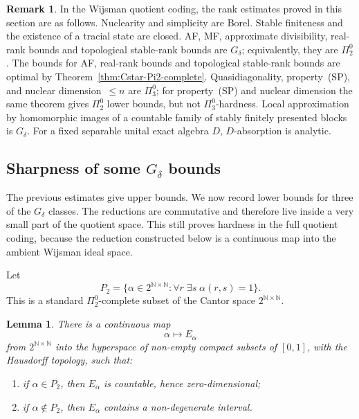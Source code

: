 \documentclass[12pt,fleqn,a4paper]{amsart}
\renewcommand{\le}{\leqslant}
\numberwithin{equation}{section}
\newtheorem{lemma}[theorem]{Lemma}
\theoremstyle{definition}
\newtheorem{remark}[theorem]{Remark}
\newcommand{\N}{\mathbb{N}}
\begin{document}
\begin{remark}\label{rem:summary}
In the Wijsman quotient coding, the rank estimates proved in this section are as
follows.  Nuclearity and simplicity are Borel.  Stable finiteness and the existence of a
tracial state are closed.  AF, MF, approximate divisibility, real-rank bounds and
topological stable-rank bounds are $G_\delta$; equivalently, they are $\Pi^0_2$.
The bounds for AF, real-rank bounds and topological stable-rank bounds are optimal by
Theorem~\ref{thm:Cstar-Pi2-complete}.  Quasidiagonality, property~(SP), and nuclear
dimension~$\le n$ are $\Pi^0_3$; for property~(SP) and nuclear dimension the same
theorem gives $\Pi^0_2$ lower bounds, but not $\Pi^0_3$-hardness.
Local approximation by homomorphic images of a countable family of stably finitely
presented blocks is $G_\delta$.  For a fixed separable unital exact algebra $D$,
$D$-absorption is analytic.
\end{remark}

\subsection{Sharpness of some \texorpdfstring{$G_\delta$}{G-delta} bounds}

The previous estimates give upper bounds.  We now record lower bounds for three of
the $G_\delta$ classes.  The reductions are commutative and therefore live inside a
very small part of the quotient space.  This still proves hardness in the full quotient
coding, because the reduction constructed below is a continuous map into the
ambient Wijsman ideal space.

Let
\[
        P_2=\{\alpha\in 2^{\N\times\N}:\forall r\;\exists s\; \alpha(r,s)=1\}.
\]
This is a standard $\Pi^0_2$-complete subset of the Cantor space $2^{\N\times\N}$.

\begin{lemma}\label{lem:compact-Pi2-test}
There is a continuous map
\[
        \alpha\longmapsto E_\alpha
\]
from $2^{\N\times\N}$ into the hyperspace of non-empty compact subsets of $[0,1]$,
with the Hausdorff topology, such that:
\begin{enumerate}
\item if $\alpha\in P_2$, then $E_\alpha$ is countable, hence zero-dimensional;
\item if $\alpha\notin P_2$, then $E_\alpha$ contains a non-degenerate interval.
\end{enumerate}
\end{lemma}
\end{document}
